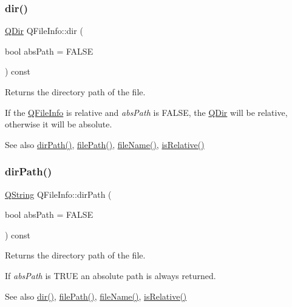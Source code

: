 \subsubsection{\texorpdfstring{dir()}{dir()}}
{\footnotesize\ttfamily \mbox{\hyperlink{class_q_dir}{Q\+Dir}} Q\+File\+Info\+::dir (\begin{DoxyParamCaption}\item[{bool}]{abs\+Path = {\ttfamily FALSE} }\end{DoxyParamCaption}) const}

Returns the directory path of the file.

If the \mbox{\hyperlink{class_q_file_info}{Q\+File\+Info}} is relative and {\itshape abs\+Path} is F\+A\+L\+SE, the \mbox{\hyperlink{class_q_dir}{Q\+Dir}} will be relative, otherwise it will be absolute.

\begin{DoxySeeAlso}{See also}
\mbox{\hyperlink{class_q_file_info_ab31c5b7d4c01901e056fa456fd9863d1}{dir\+Path()}}, \mbox{\hyperlink{class_q_file_info_af3dc855c31853287a4f4a17a18d68bc2}{file\+Path()}}, \mbox{\hyperlink{class_q_file_info_a4f6795e14c6dc89e4a54d7b5cad9d03f}{file\+Name()}}, \mbox{\hyperlink{class_q_file_info_ae1b2d0ad6ca05510092d0182e276a5d0}{is\+Relative()}} 
\end{DoxySeeAlso}
\mbox{\label{class_q_file_info_ab31c5b7d4c01901e056fa456fd9863d1}} 
\subsubsection{\texorpdfstring{dirPath()}{dirPath()}}
{\footnotesize\ttfamily \mbox{\hyperlink{class_q_string}{Q\+String}} Q\+File\+Info\+::dir\+Path (\begin{DoxyParamCaption}\item[{bool}]{abs\+Path = {\ttfamily FALSE} }\end{DoxyParamCaption}) const}

Returns the directory path of the file.

If {\itshape abs\+Path} is T\+R\+UE an absolute path is always returned.

\begin{DoxySeeAlso}{See also}
\mbox{\hyperlink{class_q_file_info_ac3d8f896db959c0688ae38500c3712f3}{dir()}}, \mbox{\hyperlink{class_q_file_info_af3dc855c31853287a4f4a17a18d68bc2}{file\+Path()}}, \mbox{\hyperlink{class_q_file_info_a4f6795e14c6dc89e4a54d7b5cad9d03f}{file\+Name()}}, \mbox{\hyperlink{class_q_file_info_ae1b2d0ad6ca05510092d0182e276a5d0}{is\+Relative()}} 
\end{DoxySeeAlso}
\mbox{\label{class_q_file_info_af7a247c24ea455875293d6406db652a4}} 
